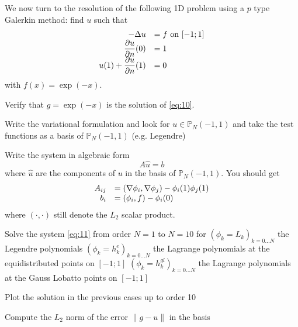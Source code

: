 \documentclass{article}
\begin{document}
\begin{Exercise}[title={p type Galerkin method in 1D}]
  \ExePart
  We now turn to the resolution of the following 1D problem using a $p$ type Galerkin method: find $u$ such that
  \begin{equation}
    \label{eq:10}
    \begin{array}[c]{rl}
      -\Delta u &= f \text{ on } [-1;1]\\
      \displaystyle \frac{\partial u}{\partial n}(0) &= 1\\
      \displaystyle u(1) + \frac{\partial u}{\partial n}(1) &= 0\\
    \end{array}
  \end{equation}
  with $f(x)=\exp(-x)$.

  \Question Verify that $g=\exp(-x)$ is the solution  of \eqref{eq:10}.

  \Question Write the variational formulation and look for $u \in
  \mathbb{P}_N(-1,1)$ and take the test functions as a basis of
  $\mathbb{P}_N(-1,1)$ (e.g. Legendre)

  \Question Write the system in algebraic form
  \begin{equation}
    \label{eq:11}
    A \hat{u} = b
  \end{equation}
  where $\hat{u}$ are the components of $u$ in the basis of
  $\mathbb{P}_N(-1,1)$.
  You should get
  \begin{equation}
    \label{eq:12}
    \begin{array}[c]{rl}
      A_{ij} &= (\nabla \phi_i, \nabla \phi_j) - \phi_i(1)\phi_j(1)\\
      b_i &= (\phi_i,f) - \phi_i(0)
    \end{array}
  \end{equation}
  where $(\cdot,\cdot)$ still denote the $L_2$ scalar product.

  \Question Solve the system \eqref{eq:11} from order $N=1$ to $N=10$ for
  \subQuestion $(\phi_k = L_k)_{k=0...N}$ the Legendre polynomials
  \subQuestion $(\phi_k = h^{e}_k)_{k=0...N}$ the Lagrange polynomials at the equidistributed points on $[-1;1]$
  \subQuestion $(\phi_k = h^{gl}_k)_{k=0...N}$ the Lagrange polynomials at the Gauss Lobatto points on $[-1;1]$

  \Question Plot the solution in the previous cases up to order 10

  \Question Compute the $L_2$ norm of the error $\|g-u\|$ in the basis
\end{Exercise}

\begin{Answer}
\end{Answer}
\end{document}
